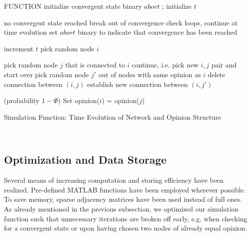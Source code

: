 \documentclass[11pt]{article}
\begin{document}
\begin{algorithm}[H]
\label{simulation pseudo}
 \SetAlgoLined
 FUNCTION\;
 initialize convergent state binary $abort$ ; initialize $t$\;
	{
		\;
		
			{
					{
							{
								no convergent state reached\;
								break out of convergence check loops, continue at time evolution\;
							}
						\Else
							{
								set $abort$ binary to indicate that convergence has been reached\;
							}
					}
			}
		
		\;
		increment $t$\;
		pick random node $i$\;
			{
				pick random node $j$ that is connected to $i$\;
					{
						continue, i.e. pick new $i,j$ pair and start over\;
					}
					{
						pick random node $j'$ out of nodes with same opinion as $i$\;
							{
							delete connection between $(i,j)$\;
							establish new connection between $(i,j')$\;
							}
					}
							
				\Else(probability $1-\Phi$)
					{
					Set opinion($i$) = opinion($j$)\;
					}
					
					
					
			}
	}
	


 \caption{Simulation Function: Time Evolution of Network and Opinion Structure}
\end{algorithm} \\



\subsection{Optimization and Data Storage}

Several means of increasing computation and storing efficiency have been realized. Pre-defined MATLAB functions have been employed wherever possible. To save memory, sparse adjacency matrices have been used instead of full ones. As already mentioned in the previous subsection, we optimized our simulation function such that unnecessary iterations are broken off early, e.g. when checking for a convergent state or upon having chosen two nodes of already equal opinion. \\
\end{document}
